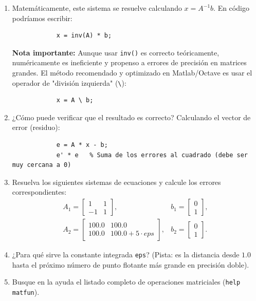 \documentclass[11pt,a4paper,openany]{book}
\begin{document}
\begin{enumerate}
	\begin{enumerate}
		\item Matemáticamente, este sistema se resuelve calculando $x = A^{-1}b$. En código podríamos escribir:
		\begin{verbatim}
			x = inv(A) * b;
		\end{verbatim}
		\textbf{Nota importante:} Aunque usar \texttt{inv()} es correcto teóricamente, numéricamente es ineficiente y propenso a errores de precisión en matrices grandes. El método recomendado y optimizado en Matlab/Octave es usar el operador de "división izquierda" (\texttt{\textbackslash}):
		\begin{verbatim}
			x = A \ b;
		\end{verbatim}
		
		\item ¿Cómo puede verificar que el resultado es correcto? Calculando el vector de error (residuo):
		\begin{verbatim}
			e = A * x - b;
			e' * e   % Suma de los errores al cuadrado (debe ser muy cercana a 0)
		\end{verbatim}
		
		\item Resuelva los siguientes sistemas de ecuaciones y calcule los errores correspondientes:
		\begin{eqnarray}
			A_{1} = \begin{bmatrix} 1 & 1 \\ -1 & 1 \end{bmatrix}, & b_{1} = \begin{bmatrix} 0 \\ 1 \end{bmatrix}, \\
			A_{2} = \begin{bmatrix} 100.0 & 100.0 \\ 100.0 & 100.0 + 5 \cdot eps \end{bmatrix}, & b_{2} = \begin{bmatrix} 0 \\ 1 \end{bmatrix}.
		\end{eqnarray}
		
		\item ¿Para qué sirve la constante integrada \texttt{eps}? (Pista: es la distancia desde $1.0$ hasta el próximo número de punto flotante más grande en precisión doble).
		
		\item Busque en la ayuda el listado completo de operaciones matriciales (\texttt{help matfun}).
	\end{enumerate}
\end{enumerate}
\end{document}
